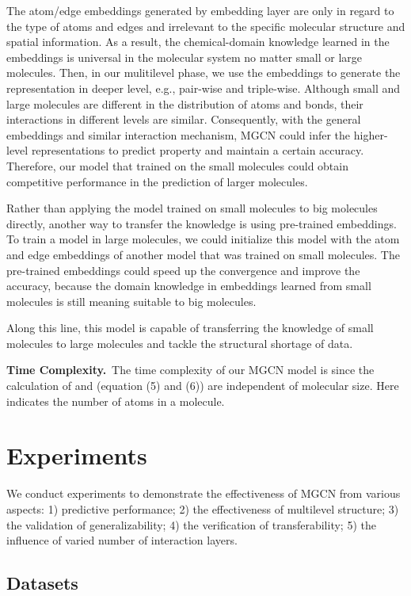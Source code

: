 \documentclass[letterpaper]{article} \usepackage{bm}
\begin{document}
The atom/edge embeddings generated by embedding layer are only in regard to the type of atoms and edges and irrelevant to the specific molecular structure and 
spatial information. As a result, the chemical-domain knowledge learned in the embeddings is universal in the molecular system no matter small or large molecules. Then, in our mulitilevel phase, we use the embeddings to generate the representation in deeper level, e.g., pair-wise and triple-wise. Although small and large molecules are different in the distribution of atoms and bonds, their interactions in different levels are similar. Consequently, with the general embeddings and similar interaction mechanism, MGCN could infer the higher-level representations to predict property and maintain a certain accuracy. Therefore, our model that trained on the small molecules could obtain competitive performance in the prediction of larger molecules.

Rather than applying the model trained on small molecules to big molecules directly, another way to transfer the knowledge is using pre-trained embeddings. To train a model in large molecules, we could initialize this model with the atom and edge embeddings of another model that was trained on small molecules. The pre-trained embeddings could speed up the convergence and improve the accuracy, because the domain knowledge in embeddings learned from small molecules is still meaning suitable to big molecules.

Along this line, this model is capable of transferring the knowledge of small molecules to large molecules and tackle the structural shortage of data.

\textbf{Time Complexity.}\ 
The time complexity of our MGCN model is  since the calculation of  and  (equation (5) and (6)) are independent of molecular size. Here  indicates the number of atoms in a molecule.


 
\section{Experiments}

We conduct experiments to demonstrate the effectiveness of MGCN from various aspects: 1) predictive performance; 2) the effectiveness of multilevel structure; 3) the validation of generalizability; 4) the verification of transferability; 5) the influence of varied number of interaction layers.


\subsection{Datasets}
\end{document}
